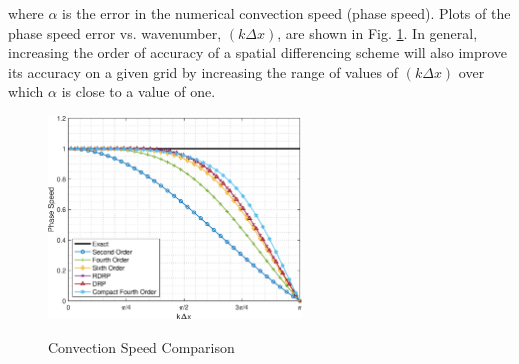 \documentclass[conf]{new-aiaa}
\begin{document}
where $\alpha$ is the error in the numerical convection speed (phase speed). 
Plots of the phase speed error vs. wavenumber, $\left(k\Delta{x}\right)$, are shown in Fig. \ref{fig:alpha}. 
In general, increasing the order of accuracy of a spatial differencing scheme will also improve its accuracy on a given grid by increasing the range of values of $\left(k\Delta{x}\right)$ over which $\alpha$ is close to a value of one. 
\begin{figure}[hbtp!]
	\centering
	{\includegraphics[width=0.6\textwidth]{Phase_Speed}}
	\caption{Convection Speed Comparison}
	\label{fig:alpha}
\end{figure}
\end{document}
